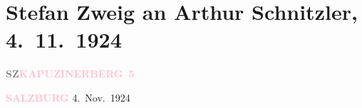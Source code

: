 

\renewcommand{\erwaehntePersonen}{Personen: Jakob Wassermann, Stefan Zweig}
\renewcommand{\erwaehnteOrte}{Orte: Paschinger Schlössl, Salzburg}
\renewcommand{\erwaehnteWerke}{Werke: ?? [Novelle, in der ein kleiner Geldbetrag ein Schicksal entscheidet], Die neue Rundschau, Fräulein Else, Ulrike Woytich. Roman}
\section[Stefan Zweig an Arthur Schnitzler, 4. 11. 1924]{Stefan Zweig an Arthur Schnitzler, 4. 11. 1924}
\nopagebreak{}
\rehead{ }\normalsize\beginnumbering{}
\toendnotes[C]{\smallbreak\pagebreak[2]}
\toendnotes[C]{\smallbreak}
\pstart
           {\pb}\textcolor{gray}{\textbf{SZ}}\hfill \textcolor{gray}{\textbf{\textcolor{pink}{KAPUZINERBERG 5}{}\ledrightnote{\textcolor{pink}{Paschinger Schlössl}}}}\pend
           
\pstart
           \raggedleft{}\textcolor{gray}{\textbf{\textcolor{pink}{SALZBURG}{}\ledrightnote{\textcolor{pink}{Salzburg}}}}{ }4. Nov. 1924\pend
           
